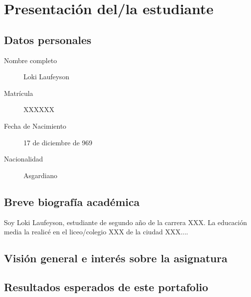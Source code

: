 \documentclass[../portafolio.tex]{subfiles}
\begin{document}
\chapter{Presentación del/la estudiante}


\section*{Datos personales}
\begin{description}
\item[{Nombre completo}] Loki Laufeyson  %
\item[{Matrícula}] XXXXXX     %
\item[{Fecha de Nacimiento}] 17 de diciembre de 969   %
\item[{Nacionalidad}] Asgardiano
\end{description}


\section*{Breve biografía académica}
Soy Loki Laufeyson, estudiante de segundo año de la carrera XXX. La educación media la realicé en el liceo/colegio XXX de la ciudad XXX....


\section*{Visión general e interés sobre la asignatura}


\section*{Resultados esperados de este portafolio}
\end{document}
